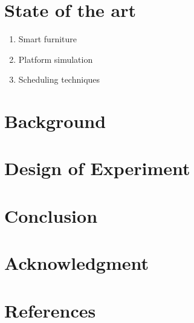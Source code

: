 \documentclass[a4paper,titlepage]{article}
\begin{document}
\section{State of the art}
\label{sec-4}
\begin{enumerate}
\item Smart furniture
\label{sec-4-1}
\item Platform simulation
\label{sec-4-2}
\item Scheduling techniques
\label{sec-4-3}
\end{enumerate}
\section{Background}
\label{sec-5}
\section{Design of Experiment}
\label{sec-6}
\section{Conclusion}
\label{sec-7}
\section{Acknowledgment}
\label{sec-8}
\section{References}
\label{sec-9}
\end{document}
